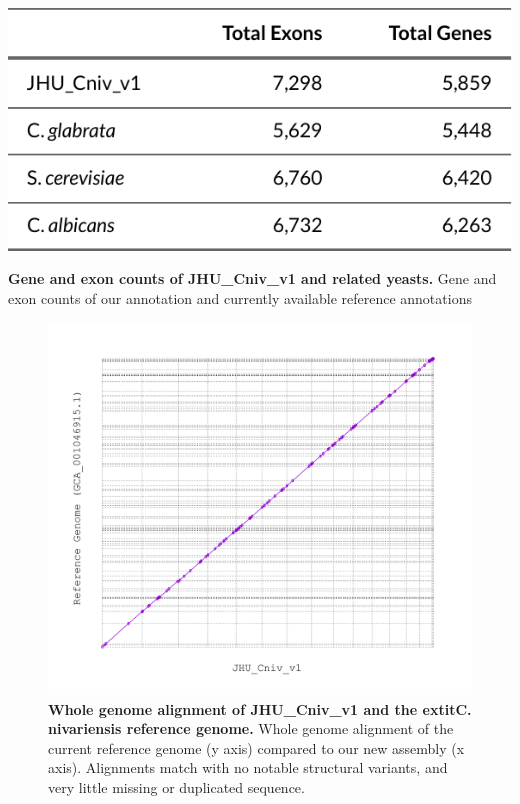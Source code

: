 \begin{table}[!ht]
\centering
\includegraphics[width = 1\linewidth,keepaspectratio]{figure/refgenestable.pdf}
\caption[Gene and exon counts of JHU\_Cniv\_v1 and related yeasts]{{\bf Gene and exon counts of JHU\_Cniv\_v1 and related yeasts.} Gene and exon counts of our annotation and currently available reference annotations }
\label{tab:telotable}
\end{table}

\begin{figure}[!ht]
\centering
\includegraphics[width = 1\linewidth,keepaspectratio]{figure/mummer.pdf}
\caption[Whole genome alignment of JHU\_Cniv\_v1 and the 	extit{C. nivariensis} reference genome]{{\bf Whole genome alignment of JHU\_Cniv\_v1 and the 	extit{C. nivariensis} reference genome.} Whole genome alignment of the current reference genome (y axis) compared to our new assembly (x axis). Alignments match with no notable structural variants, and very little missing or duplicated sequence. }
\label{fig:mummer}
\end{figure}


